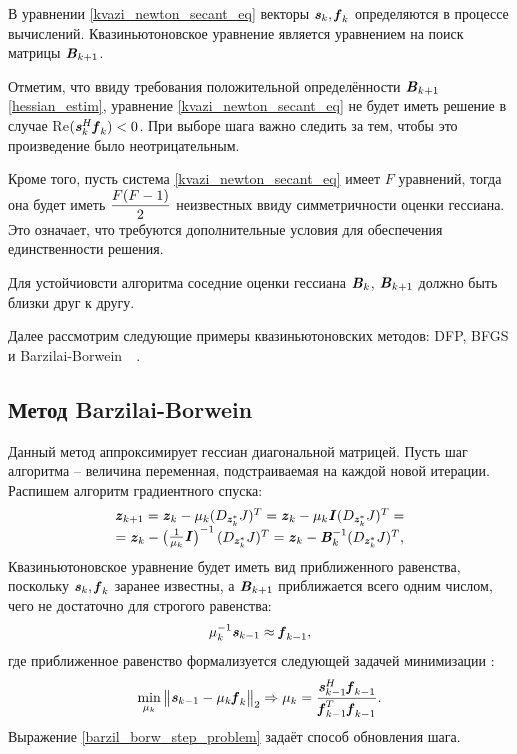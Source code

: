 В уравнении \eqref{kvazi_newton_secant_eq} векторы $\textbf{\textit{s}}_{k}, \textbf{\textit{f}}_{k}$ определяются в процессе вычислений. Квазиньютоновское уравнение является уравнением на поиск матрицы $\textbf{\textit{B}}_{k+1}$. 

Отметим, что ввиду требования положительной определённости $\textbf{\textit{B}}_{k+1}$ \eqref{hessian_estim}, уравнение \eqref{kvazi_newton_secant_eq} не будет иметь решение в случае Re$(\textbf{\textit{s}}_{k}^H\textbf{\textit{f}}_{k})<0$. При выборе шага важно следить за тем, чтобы это произведение было неотрицательным.

Кроме того, пусть система \eqref{kvazi_newton_secant_eq} имеет $F$ уравнений, тогда она будет иметь $\displaystyle\frac{F(F-1)}{2}$ неизвестных ввиду симметричности оценки гессиана. Это означает, что требуются дополнительные условия для обеспечения единственности решения.

Для устойчиовсти алгоритма соседние оценки гессиана $\textbf{\textit{B}}_{k}$, $\textbf{\textit{B}}_{k+1}$ должно быть близки друг к другу. 

Далее рассмотрим следующие примеры квазиньютоновских методов: DFP, BFGS и Barzilai-Borwein~\cite{bb_method}~\cite{pract_optimiz}.

\subsection{Метод Barzilai-Borwein} \label{subsec:quasi_newton_bb}
Данный метод аппроксимирует гессиан диагональной матрицей. Пусть шаг алгоритма -- величина переменная, подстраиваемая на каждой новой итерации. Распишем алгоритм градиентного спуска:
\begin{equation}
	\begin{matrix}
		\textbf{\textit{z}}_{k+1}=\textbf{\textit{z}}_{k}-\mu_{k}(D_{\textbf{\textit{z}}^*_{k}}J)^T=
		\textbf{\textit{z}}_{k}-\mu_{k}\textbf{\textit{I}}(D_{\textbf{\textit{z}}^*_{k}}J)^T=\\
		=\textbf{\textit{z}}_{k}-
		\begin{pmatrix}
			\frac{1}{\mu_{k}}\textbf{\textit{I}}
		\end{pmatrix}^{-1}
		(D_{\textbf{\textit{z}}^*_{k}}J)^T=
		\textbf{\textit{z}}_{k}-
		\textbf{\textit{B}}_{k}^{-1}
		(D_{\textbf{\textit{z}}^*_{k}}J)^T,
	\end{matrix}
\end{equation}
Квазиньютоновское уравнение будет иметь вид приближенного равенства, поскольку $\textbf{\textit{s}}_{k}, \textbf{\textit{f}}_{k}$ заранее известны, а $\textbf{\textit{B}}_{k+1}$ приближается всего одним числом, чего не достаточно для строгого равенства:
\begin{equation}
	\mu_{k}^{-1}\textbf{\textit{s}}_{k-1}\approx\textbf{\textit{f}}_{k-1},
\end{equation}
где приближенное равенство формализуется следующей задачей минимизации \cite{bb_method}:
\begin{equation}
	\min_{\mu_{k}}
	\begin{Vmatrix}
		\textbf{\textit{s}}_{k-1}-\mu_{k}\textbf{\textit{f}}_{k}
	\end{Vmatrix}_2\Rightarrow
	\mu_{k}=\frac{\textbf{\textit{s}}_{k-1}^H\textbf{\textit{f}}_{k-1}}
	{\textbf{\textit{f}}_{k-1}^T\textbf{\textit{f}}_{k-1}}.
	\label{barzil_borw_step_problem}
\end{equation}
Выражение \eqref{barzil_borw_step_problem} задаёт способ обновления шага.

